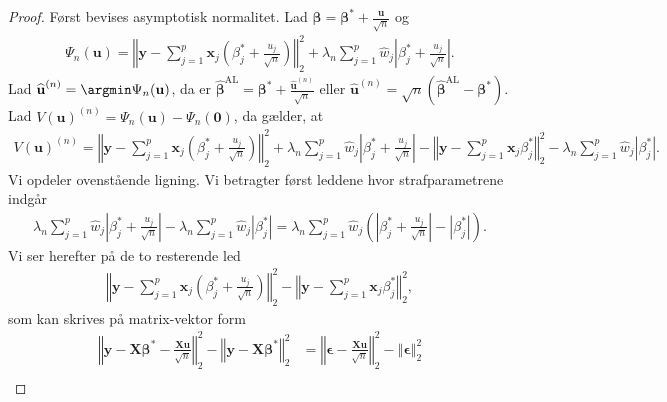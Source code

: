 \begin{proof}
Først bevises asymptotisk normalitet. Lad $\boldsymbol{\beta}=\boldsymbol{\beta}^{*} +\frac{\textbf{u}}{\sqrt{n}}$ og
\begin{align*}
\Psi_n(\textbf{u})=\left\Vert \mathbf{y}-\sum_{j=1}^p \textbf{x}_j \left( \beta_j^{*} +\frac{u_j}{\sqrt{n}} \right) \right\Vert_2^2 + \lambda_n \sum_{j=1}^p \widehat{w}_j \left\vert \beta_j^{*} + \frac{u_j}{\sqrt{n}} \right\vert.
\end{align*}
Lad $\widehat{\textbf{u}}^{(n)}=\argmin \Psi_n(\textbf{u})$, da er $\widehat{\boldsymbol{\beta}}^{{\text{AL}}}=\boldsymbol{\beta}^{*} + \frac{\widehat{\boldsymbol{u}}^{(n)}}{\sqrt{n}}$ eller $\widehat{\boldsymbol{u}}^{(n)}=\sqrt{n}\left(\widehat{\boldsymbol{\beta}}^{\text{AL}}-\boldsymbol{\beta}^{*}\right)$.
Lad $V(\mathbf{u})^{(n)}=\Psi_n(\textbf{u}) - \Psi_n(\textbf{0})$, da gælder, at
\begin{align*}
V(\mathbf{u})^{(n)}= \left\Vert \textbf{y} - \sum_{j=1}^p \textbf{x}_j \left( \beta_j^{*} + \frac{u_j}{\sqrt{n}} \right) \right\Vert_2^2 +
\lambda_n \sum_{j=1}^p \widehat{w}_j \left\vert \beta_j^{*} + \frac{u_j}{\sqrt{n}} \right\vert 
-
\left\Vert \textbf{y} - \sum_{j=1}^p \textbf{x}_j \beta_j^{*} \right\Vert_2^2 - \lambda_n \sum_{j=1}^p \widehat{w}_j \left\vert \beta_j^{*} \right\vert.
\end{align*}
Vi opdeler ovenstående ligning.
Vi betragter først leddene hvor strafparametrene indgår
\begin{align*}
\lambda_n \sum_{j=1}^p \widehat{w}_j \left\vert \beta_j^{*} + \frac{u_j}{\sqrt{n}} \right\vert- \lambda_n \sum_{j=1}^p \widehat{w}_j \left\vert \beta_j^{*} \right\vert 
= \lambda_n \sum_{j=1}^p \widehat{w}_j \left( \left\vert \beta_j^{*} + \frac{u_j}{\sqrt{n}} \right\vert - \left\vert \beta_j^{*} \right\vert
\right).
\end{align*}
Vi ser herefter på de to resterende led
\begin{align*}
\left\Vert \textbf{y} - \sum_{j=1}^p \textbf{x}_j \left( \beta_j^{*} + \frac{u_j}{\sqrt{n}} \right) \right\Vert_2^2 -\left\Vert \textbf{y} - \sum_{j=1}^p \textbf{x}_j \beta_j^{*} \right\Vert_2^2,
\end{align*}
som kan skrives på matrix-vektor form
\begin{align*}
\left\Vert \textbf{y}-\textbf{X}\boldsymbol{\beta}^{*} -\frac{\textbf{X}\textbf{u}}{\sqrt{n}} \right\Vert_2^2 - \left\Vert \textbf{y} - \textbf{X} \boldsymbol{\beta}^{*} \right\Vert_2^2  & =
\left\Vert \boldsymbol{\epsilon} - \frac{\textbf{X}\textbf{u}}{\sqrt{n}} \right\Vert_2^2 - \left\Vert \boldsymbol{\epsilon} \right\Vert_2^2  \\

\end{align*}
\end{proof}
